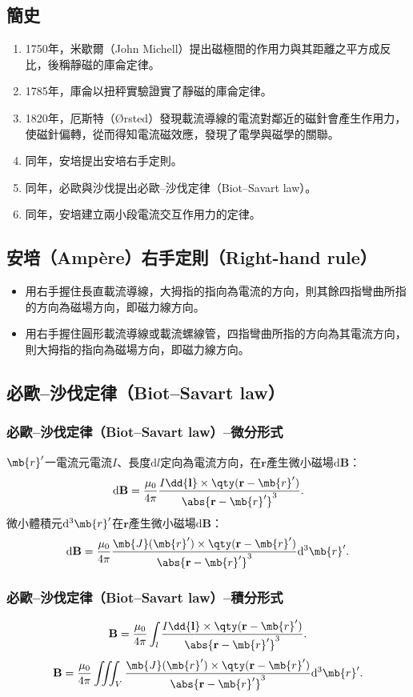\documentclass[a4paper,12pt]{report}
\begin{document}
\begin{itemize}
\subsection{簡史}
\begin{enumerate}
\item 1750年，米歇爾（John Michell）提出磁極間的作用力與其距離之平方成反比，後稱靜磁的庫侖定律。
\item 1785年，庫侖以扭秤實驗證實了靜磁的庫侖定律。
\item 1820年，厄斯特（Ørsted）發現載流導線的電流對鄰近的磁針會產生作用力，使磁針偏轉，從而得知電流磁效應，發現了電學與磁學的關聯。
\item 同年，安培提出安培右手定則。
\item 同年，必歐與沙伐提出必歐–沙伐定律（Biot–Savart law）。
\item 同年，安培建立兩小段電流交互作用力的定律。
\end{enumerate}
\subsection{安培（Ampère）右手定則（Right-hand rule）}
\begin{itemize}
\item 用右手握住長直載流導線，大拇指的指向為電流的方向，則其餘四指彎曲所指的方向為磁場方向，即磁力線方向。
\item 用右手握住圓形載流導線或載流螺線管，四指彎曲所指的方向為其電流方向，則大拇指的指向為磁場方向，即磁力線方向。
\end{itemize}
\subsection{必歐–沙伐定律（Biot–Savart law）}
\subsubsection{必歐–沙伐定律（Biot–Savart law）–微分形式}
$\mb{r}'$一電流元電流$I$、長度$\mathrm{d}l$定向為電流方向，在$\mathbf{r}$產生微小磁場$\mathrm{d}\mathbf{B}$：
\[\mathrm{d}\mathbf{B}=\frac{\mu_0}{4\pi}\frac{I\dd{\mathbf{l}}\times\qty(\mathbf{r}-\mb{r}')}{\abs{\mathbf{r}-\mb{r}'}^3}.\]
微小體積元$\mathrm{d}^3\mb{r}'$在$\mathbf{r}$產生微小磁場$\mathrm{d}\mathbf{B}$：
\[\mathrm{d}\mathbf{B}=\frac{\mu_0}{4\pi}\frac{\mb{J}(\mb{r}')\times\qty(\mathbf{r}-\mb{r}')}{\abs{\mathbf{r}-\mb{r}'}^3}\mathrm{d}^3\mb{r}'.\]
\subsubsection{必歐–沙伐定律（Biot–Savart law）–積分形式}
\[\mathbf{B}=\frac{\mu_0}{4\pi}\int_l\frac{I\dd{\mathbf{l}}\times\qty(\mathbf{r}-\mb{r}')}{\abs{\mathbf{r}-\mb{r}'}^3}.\]
\[\mathbf{B}=\frac{\mu_0}{4\pi}\iiint_V\frac{\mb{J}(\mb{r}')\times\qty(\mathbf{r}-\mb{r}')}{\abs{\mathbf{r}-\mb{r}'}^3}\mathrm{d}^3\mb{r}'.\]

\end{itemize}
\end{document}
